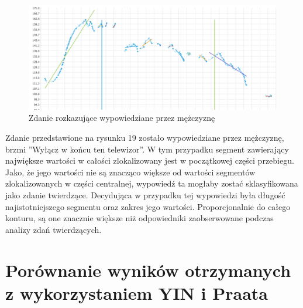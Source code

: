 \documentclass[a4paper,12 pt]{article}
\begin{document}
 \FloatBarrier
\begin{figure}[h]
\centering
\includegraphics[scale=0.7]{rozkaz_mezczyzna_telewizor.png}
\caption{Zdanie rozkazujące wypowiedziane przez mężczyznę}
\end{figure}
\FloatBarrier
Zdanie przedstawione na rysunku 19 zostało wypowiedziane przez mężczyznę, brzmi ''Wyłącz w końcu ten telewizor''.
W tym przypadku segment zawierający największe wartości w całości zlokalizowany jest w początkowej części przebiegu. Jako, że jego wartości nie są znacząco większe od wartości segmentów zlokalizowanych w części centralnej, wypowiedź ta mogłaby zostać sklasyfikowana jako zdanie twierdzące. Decydująca w przypadku tej wypowiedzi była długość najistotniejszego segmentu oraz zakres jego wartości. Proporcjonalnie do całego konturu, są one znacznie większe niż odpowiedniki zaobserwowane podczas analizy zdań twierdzących.
 
\section{Porównanie wyników otrzymanych z wykorzystaniem YIN i Praata}
\end{document}
